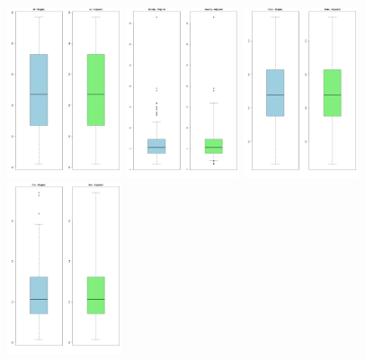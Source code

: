 \documentclass[12pt]{article}
\begin{document}
\begin{figure}[p]
  \centering
  \includegraphics[width=0.299\textwidth]{OUTPUT/BOXPLOTS/alt.png}
  \includegraphics[width=0.299\textwidth]{OUTPUT/BOXPLOTS/density.png}
  \includegraphics[width=0.299\textwidth]{OUTPUT/BOXPLOTS/frobc.png}
  \includegraphics[width=0.299\textwidth]{OUTPUT/BOXPLOTS/frsc.png}

\end{figure}
\end{document}

